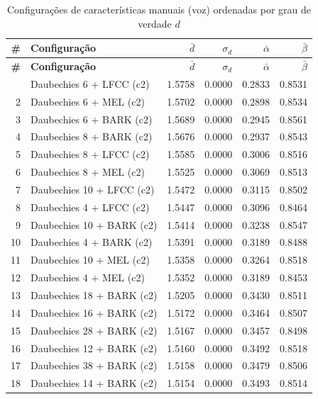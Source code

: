 \begin{longtable}{@{}rlrrrr@{}}
\caption{Configurações de características manuais (voz) ordenadas por grau de verdade $d$} \label{tab:phase00hc_voice} \\
\toprule
\textbf{\#} & \textbf{Configuração} & \textbf{$\bar{d}$} & \textbf{$\sigma_d$} & \textbf{$\bar{\alpha}$} & \textbf{$\bar{\beta}$} \\
\midrule
\endfirsthead
\toprule
\textbf{\#} & \textbf{Configuração} & \textbf{$\bar{d}$} & \textbf{$\sigma_d$} & \textbf{$\bar{\alpha}$} & \textbf{$\bar{\beta}$} \\
\midrule
\endhead
\bottomrule
\endfoot
1 & Daubechies 6 + LFCC (c2) & 1.5758 & 0.0000 & 0.2833 & 0.8531 \\
2 & Daubechies 6 + MEL (c2) & 1.5702 & 0.0000 & 0.2898 & 0.8534 \\
3 & Daubechies 6 + BARK (c2) & 1.5689 & 0.0000 & 0.2945 & 0.8561 \\
4 & Daubechies 8 + BARK (c2) & 1.5676 & 0.0000 & 0.2937 & 0.8543 \\
5 & Daubechies 8 + LFCC (c2) & 1.5585 & 0.0000 & 0.3006 & 0.8516 \\
6 & Daubechies 8 + MEL (c2) & 1.5525 & 0.0000 & 0.3069 & 0.8513 \\
7 & Daubechies 10 + LFCC (c2) & 1.5472 & 0.0000 & 0.3115 & 0.8502 \\
8 & Daubechies 4 + LFCC (c2) & 1.5447 & 0.0000 & 0.3096 & 0.8464 \\
9 & Daubechies 10 + BARK (c2) & 1.5414 & 0.0000 & 0.3238 & 0.8547 \\
10 & Daubechies 4 + BARK (c2) & 1.5391 & 0.0000 & 0.3189 & 0.8488 \\
11 & Daubechies 10 + MEL (c2) & 1.5358 & 0.0000 & 0.3264 & 0.8518 \\
12 & Daubechies 4 + MEL (c2) & 1.5352 & 0.0000 & 0.3189 & 0.8453 \\
13 & Daubechies 18 + BARK (c2) & 1.5205 & 0.0000 & 0.3430 & 0.8511 \\
14 & Daubechies 16 + BARK (c2) & 1.5172 & 0.0000 & 0.3464 & 0.8507 \\
15 & Daubechies 28 + BARK (c2) & 1.5167 & 0.0000 & 0.3457 & 0.8498 \\
16 & Daubechies 12 + BARK (c2) & 1.5160 & 0.0000 & 0.3492 & 0.8518 \\
17 & Daubechies 38 + BARK (c2) & 1.5158 & 0.0000 & 0.3479 & 0.8506 \\
18 & Daubechies 14 + BARK (c2) & 1.5154 & 0.0000 & 0.3493 & 0.8514 \\

\end{longtable}
